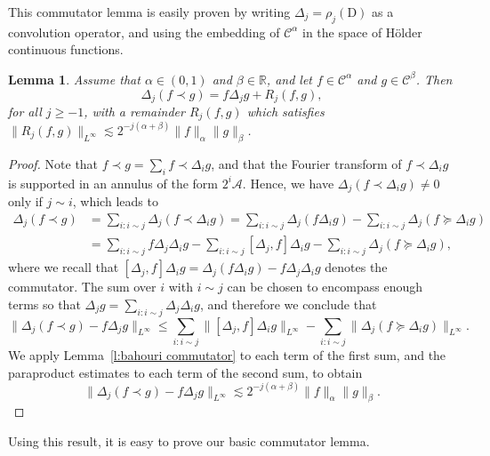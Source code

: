 \documentclass[11pt,a4paper]{article}
\newcommand{\mathD}{\mathrm{D}}
\newtheorem{lemma}[theorem]{Lemma}
\theoremstyle{remark}
\newcommand{\CA}{\ensuremath{\mathscr{A}}}
\newcommand{\CC}{\ensuremath{\mathscr{C}}}
\begin{document}
This commutator lemma is easily proven by writing $\Delta_{j} = \rho_{j} (\mathD )$ as a convolution operator, and using the embedding of $\CC^{\alpha}$ in the space of H{\"o}lder continuous functions.

\begin{lemma}\label{lemma:paraprojection}
  Assume that $\alpha \in ( 0,1 )$ and $\beta \in \mathbb{R}$, and let $f \in \CC^{\alpha}$ and $g \in \CC^{\beta}$. Then
  \[
     \Delta_{j} ( f \prec g ) =f \Delta_{j} g+R_{j} ( f,g ) ,
  \]
  for all $j \geqslant -1$, with a remainder $R_{j} ( f,g )$ which satisfies $\| R_{j} ( f,g ) \|_{L^{\infty}} \lesssim 2^{-j ( \alpha + \beta )} \| f \|_{\alpha} \| g  \|_{\beta}$.
\end{lemma}

\begin{proof}
  Note that $f \prec g= \sum_{i} f \prec \Delta_{i} g$, and that the Fourier  transform of $f \prec \Delta_{i} g$ is supported in an annulus of the form $2^{i} \CA$. Hence, we have $\Delta_{j} ( f \prec \Delta_{i} g ) \neq 0$ only if $j \sim i$, which leads to
  \begin{align*}
     \Delta_{j} ( f \prec g ) &= \sum_{i:i \sim j} \Delta_{j} ( f \prec \Delta_{i} g ) = \sum_{i:i \sim j} \Delta_{j} ( f \Delta_{i} g ) -  \sum_{i:i \sim j} \Delta_{j} ( f \succcurlyeq \Delta_{i} g ) \\
     & = \sum_{i:i \sim j} f \Delta_{j} \Delta_{i} g- \sum_{i:i \sim j} [\Delta_{j} ,f ] \Delta_{i} g- \sum_{i:i \sim j} \Delta_{j} ( f \succcurlyeq \Delta_{i} g ),
  \end{align*}
  where we recall that $[ \Delta_{j} ,f ] \Delta_{i} g= \Delta_{j} ( f\Delta_{i} g ) -f \Delta_{j} \Delta_{i} g$ denotes the commutator. The sum over $i$ with $i \sim j$ can be chosen to encompass enough terms so that $\Delta_{j} g= \sum_{i:i \sim j} \Delta_{j} \Delta_{i} g$, and therefore we conclude that
  \[
     \| \Delta_{j} ( f \prec g ) -f \Delta_{j} g \|_{L^{\infty}} \leqslant  \sum_{i:i \sim j} \| [ \Delta_{j} ,f ] \Delta_{i} g \|_{L^{\infty}} -  \sum_{i:i \sim j} \| \Delta_{j} ( f \succcurlyeq \Delta_{i} g )
     \|_{L^{\infty}}.
  \]
  We apply Lemma~\ref{l:bahouri commutator} to each term of the first sum, and the paraproduct estimates to each term of the second sum, to obtain
  \[
     \| \Delta_{j} ( f \prec g ) -f \Delta_{j} g \|_{L^{\infty}} \lesssim  2^{-j ( \alpha + \beta )} \| f \|_{\alpha} \| g \|_{\beta} .
  \]
\end{proof}

Using this result, it is easy to prove our basic commutator lemma.
\end{document}
